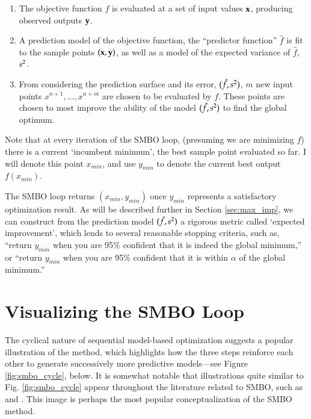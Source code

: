 \begin{minipage}{\textwidth}
\begin{framed}

\begin{enumerate} 
\item The objective function $f$ is evaluated at a set of input values $\mathbf{x}$, producing observed outputs $\mathbf{y}$.
\item A prediction model of the objective function, the ``predictor function'' $\hat{f}$ is fit to the sample points $(\mathbf{x},\mathbf{y})$, as well as a model of the expected variance of $\hat{f}$, $s^2$.
\item From considering the prediction surface and its error, $(\hat{f},s^2)$, $m$ new input points $x^{n+1},...,x^{n+m}$ are chosen to be evaluated by $f$. These points are chosen to most improve the ability of the model $(\hat{f},s^2)$ to find the global optimum.\end{enumerate}
\end{framed}

\label{fig:smbo_loop}
\end{minipage}


Note that at every iteration of the SMBO loop, (presuming we are minimizing $f$) there is a current `incumbent minimum', the best sample point evaluated so far. I will denote this point $x_{min}$, and use $y_{min}$ to denote the current best output $f(x_{min})$.

The SMBO loop returns $(x_{min},y_{min})$ once $y_{min}$ represents a satisfactory optimization result. As will be described further in Section \ref{sec:max_imp}, we can construct from the prediction model $(\hat{f},s^2)$ a rigorous metric called `expected improvement', which lends to several reasonable stopping criteria, such as, ``return $y_{min}$ when you are 95\% confident that it is indeed the global minimum,'' or ``return $y_{min}$ when you are 95\% confident that it is within $\alpha$ of the global minimum.''

\section{Visualizing the SMBO Loop}

The cyclical nature of sequential model-based optimization suggests a popular illustration of the method, which highlights how the three steps reinforce each other to generate successively more predictive models---see Figure \ref{fig:smbo_cycle}, below. It is somewhat notable that illustrations quite similar to Fig. \ref{fig:smbo_cycle} appear throughout the literature related to SMBO, such as \cite{hutter_sequential_2011} and \cite{protolife_pdt_2013}. This image is perhaps the most popular conceptualization of the SMBO method.

